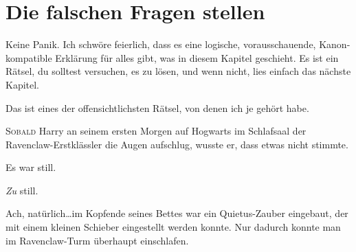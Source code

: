 \chapter{Die falschen Fragen stellen}

\begin{chapterOpeningAuthorNote}
%
Keine Panik. Ich schwöre feierlich, dass es eine logische, vorausschauende, Kanon-kompatible Erklärung für alles gibt, was in diesem Kapitel geschieht. Es ist ein Rätsel, du solltest versuchen, es zu lösen, und wenn nicht, lies einfach das nächste Kapitel.
\end{chapterOpeningAuthorNote}
\begin{chapterOpeningQuote}
Das ist eines der offensichtlichsten Rätsel, von denen ich je gehört habe.
\end{chapterOpeningQuote}



\lettrine{S}{obald} Harry an seinem ersten Morgen auf Hogwarts im Schlafsaal der Ravenclaw-Erstklässler die Augen aufschlug, wusste er, dass etwas nicht stimmte.

Es war still.

\emph{Zu} still.

Ach, natürlich…im Kopfende seines Bettes war ein Quietus-Zauber eingebaut, der mit einem kleinen Schieber eingestellt werden konnte. Nur dadurch konnte man im Ravenclaw-Turm überhaupt einschlafen.

